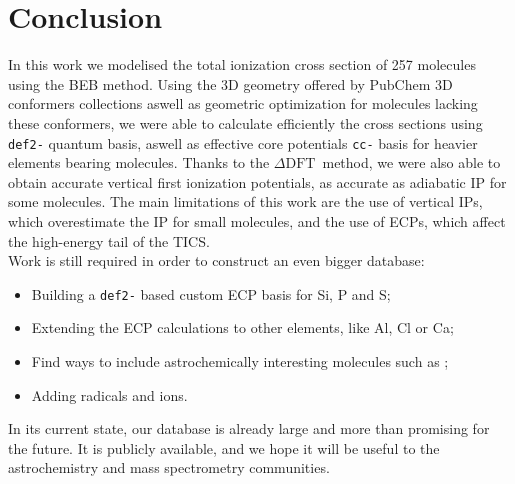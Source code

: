 \documentclass[article,preview]{planetary}
\newcommand{\dft}{\ensuremath{\Delta\textrm{DFT}}}
\begin{document}
\section{Conclusion}
In this work we modelised the total ionization cross section of 257 molecules using the BEB method. Using the 3D geometry offered by PubChem 3D conformers collections aswell as geometric optimization for molecules lacking these conformers, we were able to calculate efficiently the cross sections using \verb|def2-| quantum basis, aswell as  effective core potentials \verb|cc-| basis for heavier elements bearing molecules. Thanks to the \dft~method, we were also able to obtain accurate vertical first ionization potentials, as accurate as adiabatic IP for some molecules. The main limitations of this work are the use of vertical IPs, which overestimate the IP for small molecules, and the use of ECPs, which affect the high-energy tail of the TICS.\\
Work is still required in order to construct an even bigger database:
\begin{itemize}
    \item Building a \verb|def2-| based custom ECP basis for Si, P and S;
    \item Extending the ECP calculations to other elements, like Al, Cl or Ca;
    \item Find ways to include astrochemically interesting molecules such as ;
    \item Adding radicals and ions.  
\end{itemize}
In its current state, our database is already large and more than promising for the future. It is publicly available, and we hope it will be useful to the astrochemistry and mass spectrometry communities.


\end{document}
